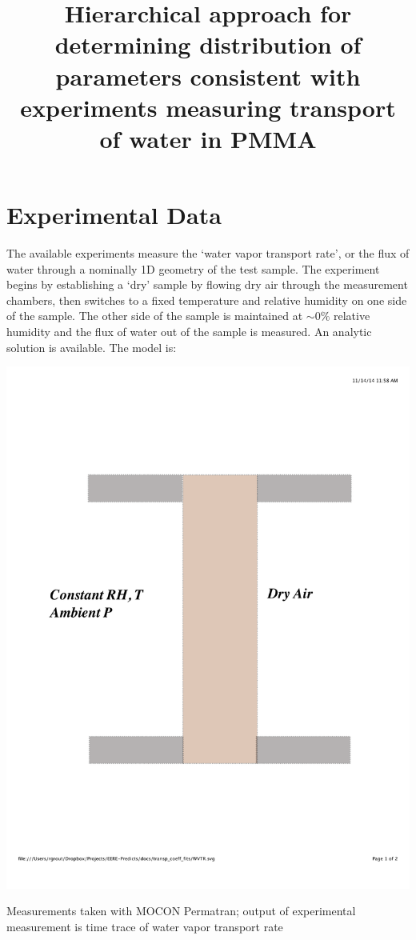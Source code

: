\documentclass{tufte-handout}
\title{Hierarchical approach for determining distribution of parameters consistent with experiments measuring transport of water in PMMA}
\author[]{}
\begin{document}
\maketitle%




\section{Experimental Data}
The available experiments measure the `water vapor transport rate', or the flux
of water through a nominally 1D geometry of the test sample. The experiment
begins by establishing a `dry' sample by flowing dry air through the
measurement chambers, then switches to a fixed temperature and relative
humidity on one side of the sample. The other side of the sample is maintained
at $\sim 0\%$ relative humidity and the flux of water out of the sample is
measured. An analytic solution is available. The model is:
\begin{marginfigure}%
    \includegraphics[width=1.0\linewidth]{WVTR.pdf}
    \caption{
    Measurements taken with MOCON Permatran; output of experimental measurement
is time trace of water vapor transport rate }
    \label{fig:marginfig}
\end{marginfigure}
\end{document}

